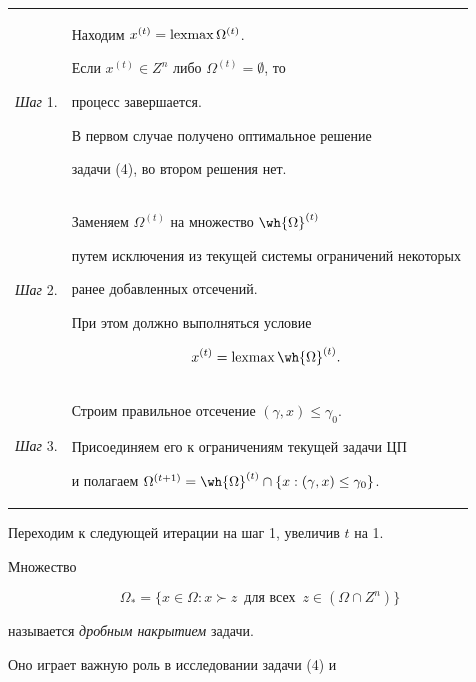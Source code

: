 \begin{tabular}{p{14mm}p{145mm}}


{\it Шаг} 1. & Находим $x^{(t)} = \operatorname{lexmax} \Omega^{(t)}$.     


Если $x^{(t)} \in Z^{n}$ либо $ \Omega^{(t)} = \emptyset$, то


процесс завершается. 


В первом случае получено оптимальное решение


задачи (4), во втором  решения нет.\\





{\it Шаг} 2. & Заменяем $ \Omega^{(t)}$ на множество $ \wh{ \Omega}^{(t)}$ 


путем исключения из текущей системы  ограничений некоторых


ранее добавленных отсечений.


При этом должно выполняться условие 


$$


x^{(t)} = \lexmax \wh{ \Omega}^{(t)}.


$$


\\


{\it Шаг} 3. & Строим правильное отсечение  $( \gamma,x) \leq \gamma_{0}$.


Присоединяем его к ограничениям текущей задачи ЦП


и полагаем $ \Omega^{(t+1)} = \wh{ \Omega}^{(t)} \cap \{x:


( \gamma,x) \leq \gamma_{0} \}$.


\end{tabular}





\noindent{}Переходим к следующей итерации на шаг 1, увеличив $t$ на 1. 


\medskip








Множество


$$


\Omega_{*}= \{x \in \Omega:x \succ z \ \; \text{для всех}  


\ \; z \in ( \Omega \cap Z^{n}) \}


$$


называется { \it дробным накрытием} задачи.


Оно играет важную роль в исследовании задачи (4) и 


